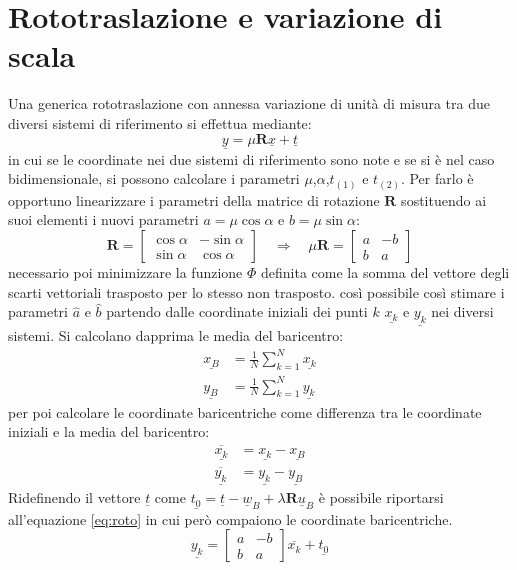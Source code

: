 \chapter{Rototraslazione e variazione di scala}\label{cap:cap3}
Una generica rototraslazione con annessa variazione di unità di misura tra due diversi sistemi di riferimento si effettua mediante:
\begin{equation}
	\label{eq:roto}
	\underline{y}=\mu \mathbf{R} \underline{x}+\underline{t}
\end{equation}
in cui se le coordinate nei due sistemi di riferimento sono note e se si è nel caso bidimensionale, si possono calcolare i parametri $\mu$,$\alpha$,$t_{(1)}$ e $t_{(2)}$.
Per farlo è opportuno linearizzare i parametri della matrice di rotazione $\mathbf{R}$ sostituendo ai suoi elementi i nuovi parametri $a=\mu\cos\alpha$ e $b=\mu\sin\alpha$:
\[
\mathbf{R}=
\begin{bmatrix}
\cos\alpha & -\sin\alpha \\ 
\sin\alpha & \cos\alpha
\end{bmatrix} 
\quad \Longrightarrow \quad
\mu \mathbf{R} = 
\begin{bmatrix}
a & -b \\ 
b & a
\end{bmatrix} 
\]
\e necessario poi minimizzare la funzione $\Phi$ definita come la somma del vettore degli scarti vettoriali trasposto per lo stesso non trasposto.
\e così possibile così stimare i parametri $\hat{a}$ e $\hat{b}$ partendo dalle coordinate iniziali dei punti $k$ $\underline{x_k}$ e $\underline{y_k}$ nei diversi sistemi.
Si calcolano dapprima le media del baricentro:
\begin{align}
\underline{x_B} &= \frac{1}{N}\sum_{k=1}^{N}\underline{x_k}\\
\underline{y_B} &= \frac{1}{N}\sum_{k=1}^{N}\underline{y_k}
\end{align}
per poi calcolare le coordinate baricentriche come differenza tra le coordinate iniziali e la media del baricentro:
\begin{align}
\overline{\underline{x_k}} &= \underline{x_k} - \underline{x_B}\\
\overline{\underline{y_k}} &= \underline{y_k} - \underline{y_B}
\end{align}
Ridefinendo il vettore $\underline{t}$ come $\underline{t_{0}}=\underline{t}-\underline{w}_{B}+\lambda \mathbf{R} \underline{u}_{B}$ è possibile riportarsi all'equazione \ref{eq:roto} in cui però compaiono le coordinate baricentriche.
\begin{equation}
\underline{y_{k}}=
\begin{bmatrix}
	{a} & {-b} \\ 
	{b} & {a}
\end{bmatrix} 
\overline{x_{k}}+\underline{t_{0}}
\end{equation}
